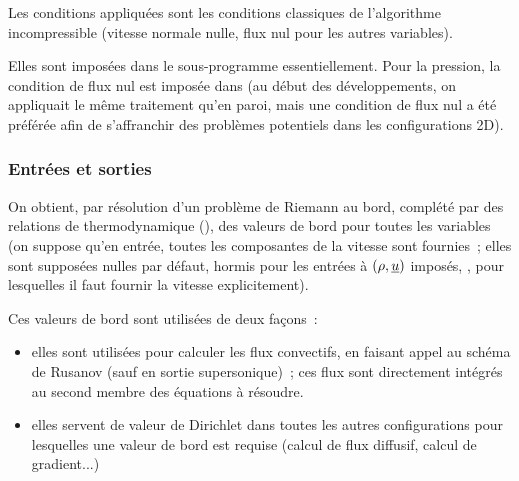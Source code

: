 Les conditions appliquées sont les conditions classiques de l'algorithme
incompressible (vitesse normale nulle, flux nul pour les autres variables).

Elles sont imposées dans le sous-programme  essentiellement. Pour
la pression, la condition de flux nul est imposée dans 
(au début des développements, on appliquait le même traitement qu'en paroi,
mais une condition de flux nul a été préférée afin de s'affranchir des
problèmes potentiels dans les configurations 2D).


\subsubsection*{Entrées et sorties}

On obtient, par résolution d'un problème de Riemann au bord, complété par
des relations de thermodynamique (), des valeurs de bord pour toutes
les variables (on suppose qu'en entrée, toutes les composantes de la vitesse
sont fournies~; elles sont supposées nulles par défaut, hormis pour les
entrées à $(\rho,\underline{u})$ imposés, , pour lesquelles il faut
fournir la vitesse explicitement).

Ces valeurs de bord sont utilisées de deux façons~:
\begin{itemize}
\item elles sont utilisées pour calculer les flux convectifs, en faisant
appel au schéma de Rusanov (sauf en sortie supersonique)~; ces flux sont
directement intégrés au second membre des équations à résoudre.
\item elles servent de valeur de Dirichlet dans toutes les autres configurations
pour lesquelles une valeur de bord est requise (calcul de flux diffusif,
calcul de gradient...)
\end{itemize}

